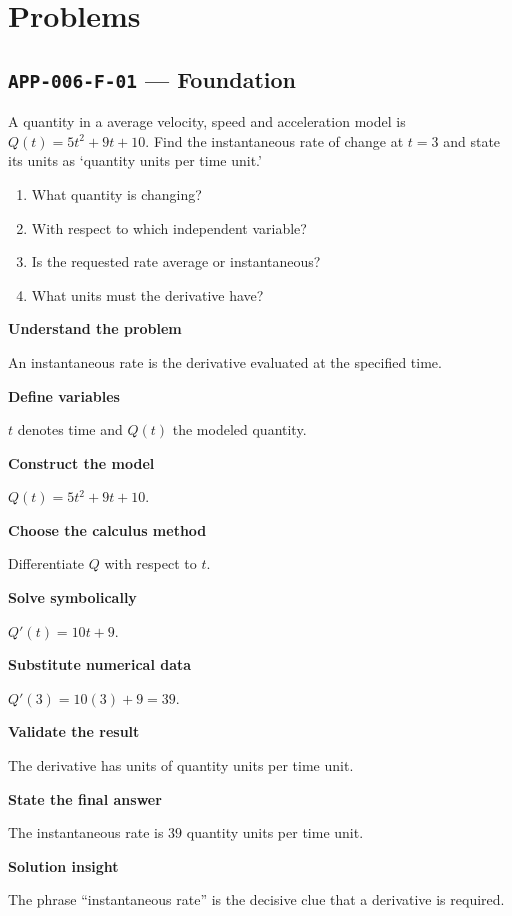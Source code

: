 \documentclass[11pt]{book}
\newcommand{\pid}[1]{\texttt{#1}}
\begin{document}
\section*{Problems}
\subsection*{\pid{APP-006-F-01} — Foundation}
\begin{problembox}
A quantity in a average velocity, speed and acceleration model is $Q(t)=5t^2+9t+10$. Find the instantaneous rate of change at $t=3$ and state its units as ‘quantity units per time unit.’
\end{problembox}
\begin{promptbox}\begin{enumerate}
\item What quantity is changing?
\item With respect to which independent variable?
\item Is the requested rate average or instantaneous?
\item What units must the derivative have?
\end{enumerate}\end{promptbox}
\begin{solutionbox}
\textbf{Understand the problem}\par An instantaneous rate is the derivative evaluated at the specified time.\par\medskip
\textbf{Define variables}\par $t$ denotes time and $Q(t)$ the modeled quantity.\par\medskip
\textbf{Construct the model}\par $Q(t)=5t^2+9t+10$.\par\medskip
\textbf{Choose the calculus method}\par Differentiate $Q$ with respect to $t$.\par\medskip
\textbf{Solve symbolically}\par $Q'(t)=10t+9$.\par\medskip
\textbf{Substitute numerical data}\par $Q'(3)=10(3)+9=39$.\par\medskip
\textbf{Validate the result}\par The derivative has units of quantity units per time unit.\par\medskip
\textbf{State the final answer}\par The instantaneous rate is $39$ quantity units per time unit.\par\medskip
\textbf{Solution insight}\par The phrase “instantaneous rate” is the decisive clue that a derivative is required.\par\medskip
\end{solutionbox}
\end{document}
